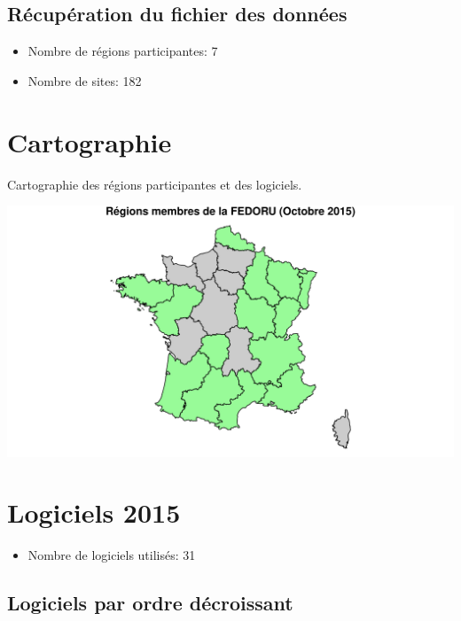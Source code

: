 \documentclass[]{article}
\providecommand{\tightlist}{%
  \setlength{\itemsep}{0pt}\setlength{\parskip}{0pt}}
\begin{document}
\subsection{Récupération du fichier des
données}\label{recuperation-du-fichier-des-donnees}

\begin{itemize}
\tightlist
\item
  Nombre de régions participantes: 7
\item
  Nombre de sites: 182
\end{itemize}

\section{Cartographie}\label{cartographie}

Cartographie des régions participantes et des logiciels.

\includegraphics{septembre2015_files/figure-latex/carto_region-1.pdf}

\section{Logiciels 2015}\label{logiciels-2015}

\begin{itemize}
\tightlist
\item
  Nombre de logiciels utilisés: 31
\end{itemize}

\subsection{Logiciels par ordre
décroissant}\label{logiciels-par-ordre-decroissant}
\end{document}
